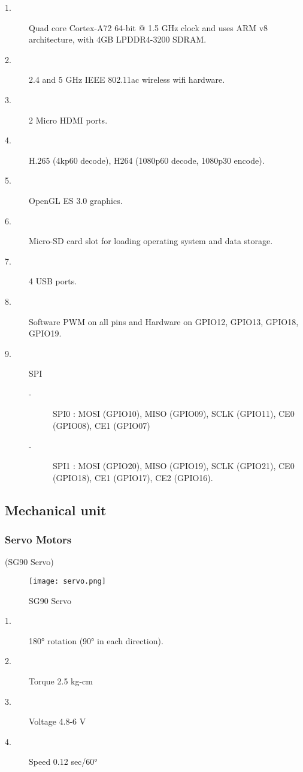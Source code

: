\documentclass[../../../patent_v1.tex]{subfiles}
\begin{document}
\begin{description}
    \item[1.]Quad core Cortex-A72 64-bit @ 1.5 GHz clock and uses ARM v8 architecture, 
    with 4GB LPDDR4-3200 SDRAM.
    \item[2.]2.4 and 5 GHz IEEE 802.11ac wireless wifi hardware.
    \item[3.]2 Micro HDMI ports.
    \item[4.]H.265 (4kp60 decode), H264 (1080p60 decode, 1080p30 encode).
    \item[5.]OpenGL ES 3.0 graphics.
    \item[6.]Micro-SD card slot for loading operating system and data storage.
    \item[7.]4 USB ports.
    \item[8.]Software PWM on all pins and Hardware on GPIO12, GPIO13, GPIO18, GPIO19.
    \item[9.]SPI
    \begin{description}
        \item[-]SPI0 : MOSI (GPIO10), MISO (GPIO09), SCLK (GPIO11), CE0 (GPIO08), CE1 (GPIO07)
        \item[-]SPI1 : MOSI (GPIO20), MISO (GPIO19), SCLK (GPIO21), CE0 (GPIO18), CE1 (GPIO17), CE2 (GPIO16).  
    \end{description}  
\end{description}

\subsection{Mechanical unit}

\subsubsection{Servo Motors}

(SG90 Servo)

\begin{figure}[ht]
    \centering
    \texttt{[image: servo.png]}
    \caption{SG90 Servo}
\end{figure}

\FloatBarrier

\begin{description}
    \item[1.]180\si{\degree} rotation (90\si{\degree} in each direction).
    \item[2.]Torque 2.5 kg-cm
    \item[3.]Voltage 4.8-6 V  
    \item[4.]Speed 0.12 sec/60\si{\degree}
\end{description}
\end{document}
